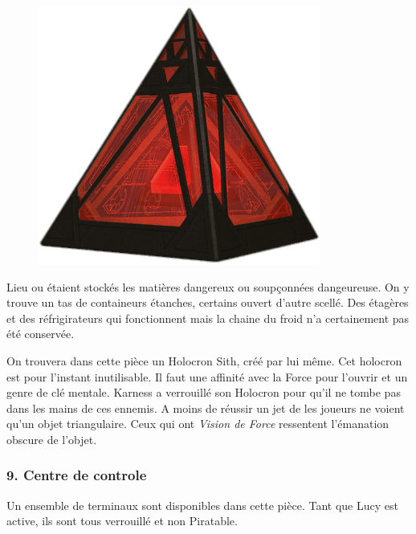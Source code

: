 \begin{figure}
    \vspace{-5\baselineskip}
    \centering\includegraphics[width=\linewidth]{_img/dos-au-muur/holocron-sith.png}
    \vspace{-2\baselineskip} 
\end{figure}
Lieu ou étaient stockés les matières dangereux ou soupçonnées dangeureuse. On y trouve un tas de containeurs étanches, certains ouvert d’autre scellé. Des étagères et des réfrigirateurs qui fonctionnent mais la chaine du froid n’a certainement pas été conservée.

On trouvera dans cette pièce un Holocron Sith, créé par  lui même. Cet holocron est pour l’instant inutilisable. Il faut une affinité avec la Force pour l’ouvrir et un genre de clé mentale. Karness a verrouillé son Holocron pour qu’il ne tombe pas dans les mains de ces ennemis. A moins de réussir un jet de  les joueurs ne voient qu’un objet triangulaire. Ceux qui ont \textit{Vision de Force} ressentent l’émanation obscure de l’objet.

\subsubsection{9. Centre de controle}
Un ensemble de terminaux sont disponibles dans cette pièce. Tant que Lucy est active, ils sont tous verrouillé et non Piratable.

